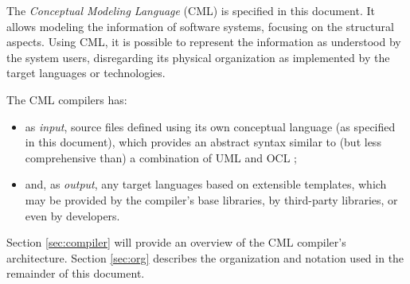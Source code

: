The \emph{Conceptual Modeling Language} (CML) is specified in this document.
It allows modeling the information of software systems,
focusing on the structural aspects.
Using CML,
it is possible to represent the information as understood by the system users,
disregarding its physical organization as implemented by the target languages or technologies.

The CML compilers has:
\begin{itemize}
\item as \emph{input},
source files defined using its own conceptual language (as specified in this document),
which provides an abstract syntax similar to (but less comprehensive than) a combination of UML \cite{uml} and OCL \cite{ocl};
\item and, as \emph{output},
any target languages based on extensible templates,
which may be provided by the compiler's base libraries, by third-party libraries, or even by developers.
\end{itemize}

Section \ref{sec:compiler} will provide an overview of the CML compiler's architecture.
Section \ref{sec:org} describes the organization and notation
used in the remainder of this document.

